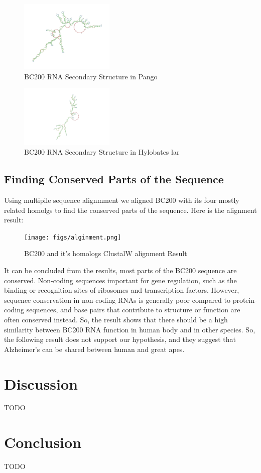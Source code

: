 \documentclass[conference]{IEEEtran}
\begin{document}
\begin{figure}[h]
  \centering
  \includegraphics[width=0.4\textwidth]{figs/rnapango.png}
  \caption{BC200 RNA Secondary Structure in Pango}
  \label{fig:pango-structure}
\end{figure}

\begin{figure}[h]
  \centering
  \includegraphics[width=0.4\textwidth]{figs/rna.png}
  \caption{BC200 RNA Secondary Structure in Hylobates lar}
  \label{fig:hylobates-structure}
\end{figure}


\subsection{Finding Conserved Parts of the Sequence}

Using multipile sequence alignmment we aligned BC200 with its four mostly related homolgs to find the conserved parts of the sequence.
Here is the alignment result:

\begin{figure}[h]
  \centering
  \texttt{[image: figs/alginment.png]}
  \caption{BC200 and it's homologs ClustalW alignment Result}
  \label{fig:alignment result}
\end{figure}

It can be concluded from the results, most parts of the BC200 sequence are conserved. Non-coding sequences important for gene regulation, such as the binding or recognition sites of ribosomes and transcription factors. However, sequence conservation in non-coding RNAs is generally poor compared to protein-coding sequences, and base pairs that contribute to structure or function are often conserved instead\cite{johnsson2014evolutionary}. So, the result shows that there should be a high similarity between BC200 RNA function in human body and in other species. So, the following result does not support our hypothesis, and they suggest that Alzheimer’s can be shared between human and great apes.


\section{Discussion}\label{sec:discussion}
TODO

\section{Conclusion}\label{sec:conclusion}
TODO



\end{document}
